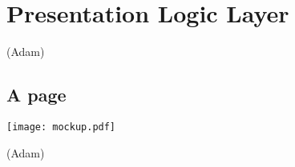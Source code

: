 \section{Presentation Logic Layer}


(Adam)

\subsection{A page}


\texttt{[image: mockup.pdf]}

(Adam)